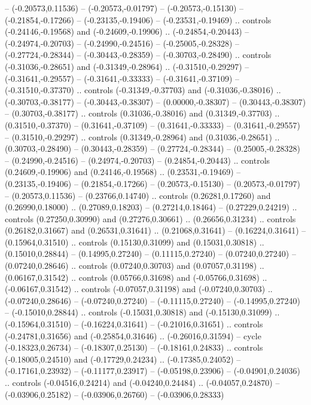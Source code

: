 {{-- (-0.20573,0.11536)
-- (-0.20573,-0.01797)
-- (-0.20573,-0.15130)
-- (-0.21854,-0.17266)
-- (-0.23135,-0.19406)
-- (-0.23531,-0.19469)
.. controls (-0.24146,-0.19568) and (-0.24609,-0.19906) .. (-0.24854,-0.20443)
-- (-0.24974,-0.20703)
-- (-0.24990,-0.24516)
-- (-0.25005,-0.28328)
-- (-0.27724,-0.28344)
-- (-0.30443,-0.28359)
-- (-0.30703,-0.28490)
.. controls (-0.31036,-0.28651) and (-0.31349,-0.28964) .. (-0.31510,-0.29297)
-- (-0.31641,-0.29557)
-- (-0.31641,-0.33333)
-- (-0.31641,-0.37109)
-- (-0.31510,-0.37370)
.. controls (-0.31349,-0.37703) and (-0.31036,-0.38016) .. (-0.30703,-0.38177)
-- (-0.30443,-0.38307)
-- (0.00000,-0.38307)
-- (0.30443,-0.38307)
-- (0.30703,-0.38177)
.. controls (0.31036,-0.38016) and (0.31349,-0.37703) .. (0.31510,-0.37370)
-- (0.31641,-0.37109)
-- (0.31641,-0.33333)
-- (0.31641,-0.29557)
-- (0.31510,-0.29297)
.. controls (0.31349,-0.28964) and (0.31036,-0.28651) .. (0.30703,-0.28490)
-- (0.30443,-0.28359)
-- (0.27724,-0.28344)
-- (0.25005,-0.28328)
-- (0.24990,-0.24516)
-- (0.24974,-0.20703)
-- (0.24854,-0.20443)
.. controls (0.24609,-0.19906) and (0.24146,-0.19568) .. (0.23531,-0.19469)
-- (0.23135,-0.19406)
-- (0.21854,-0.17266)
-- (0.20573,-0.15130)
-- (0.20573,-0.01797)
-- (0.20573,0.11536)
-- (0.23766,0.14740)
.. controls (0.26281,0.17260) and (0.26990,0.18000) .. (0.27089,0.18203)
-- (0.27214,0.18464)
-- (0.27229,0.24219)
.. controls (0.27250,0.30990) and (0.27276,0.30661) .. (0.26656,0.31234)
.. controls (0.26182,0.31667) and (0.26531,0.31641) .. (0.21068,0.31641)
-- (0.16224,0.31641)
-- (0.15964,0.31510)
.. controls (0.15130,0.31099) and (0.15031,0.30818) .. (0.15010,0.28844)
-- (0.14995,0.27240)
-- (0.11115,0.27240)
-- (0.07240,0.27240)
-- (0.07240,0.28646)
.. controls (0.07240,0.30703) and (0.07057,0.31198) .. (0.06167,0.31542)
.. controls (0.05766,0.31698) and (-0.05766,0.31698) .. (-0.06167,0.31542)
.. controls (-0.07057,0.31198) and (-0.07240,0.30703) .. (-0.07240,0.28646)
-- (-0.07240,0.27240)
-- (-0.11115,0.27240)
-- (-0.14995,0.27240)
-- (-0.15010,0.28844)
.. controls (-0.15031,0.30818) and (-0.15130,0.31099) .. (-0.15964,0.31510)
-- (-0.16224,0.31641)
-- (-0.21016,0.31651)
.. controls (-0.24781,0.31656) and (-0.25854,0.31646) .. (-0.26016,0.31594)
-- cycle
(-0.18323,0.26734)
-- (-0.18307,0.25130)
-- (-0.18161,0.24833)
.. controls (-0.18005,0.24510) and (-0.17729,0.24234) .. (-0.17385,0.24052)
-- (-0.17161,0.23932)
-- (-0.11177,0.23917)
-- (-0.05198,0.23906)
-- (-0.04901,0.24036)
.. controls (-0.04516,0.24214) and (-0.04240,0.24484) .. (-0.04057,0.24870)
-- (-0.03906,0.25182)
-- (-0.03906,0.26760)
-- (-0.03906,0.28333)
}}
